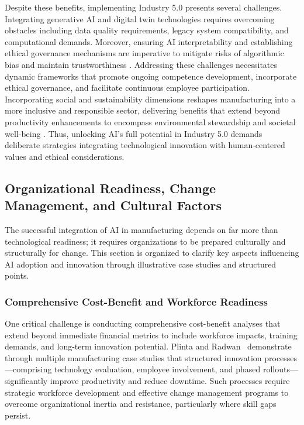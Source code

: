 \documentclass[sigconf]{acmart}
\begin{document}
Despite these benefits, implementing Industry 5.0 presents several challenges. Integrating generative AI and digital twin technologies requires overcoming obstacles including data quality requirements, legacy system compatibility, and computational demands. Moreover, ensuring AI interpretability and establishing ethical governance mechanisms are imperative to mitigate risks of algorithmic bias and maintain trustworthiness \cite{ref6,ref36}. Addressing these challenges necessitates dynamic frameworks that promote ongoing competence development, incorporate ethical governance, and facilitate continuous employee participation. Incorporating social and sustainability dimensions reshapes manufacturing into a more inclusive and responsible sector, delivering benefits that extend beyond productivity enhancements to encompass environmental stewardship and societal well-being \cite{ref38}. Thus, unlocking AI’s full potential in Industry 5.0 demands deliberate strategies integrating technological innovation with human-centered values and ethical considerations.

\subsection{Organizational Readiness, Change Management, and Cultural Factors}

The successful integration of AI in manufacturing depends on far more than technological readiness; it requires organizations to be prepared culturally and structurally for change. This section is organized to clarify key aspects influencing AI adoption and innovation through illustrative case studies and structured points.

\subsubsection*{Comprehensive Cost-Benefit and Workforce Readiness}

One critical challenge is conducting comprehensive cost-benefit analyses that extend beyond immediate financial metrics to include workforce impacts, training demands, and long-term innovation potential. Plinta and Radwan~\cite{ref19} demonstrate through multiple manufacturing case studies that structured innovation processes—comprising technology evaluation, employee involvement, and phased rollouts—significantly improve productivity and reduce downtime. Such processes require strategic workforce development and effective change management programs to overcome organizational inertia and resistance, particularly where skill gaps persist.
\end{document}
